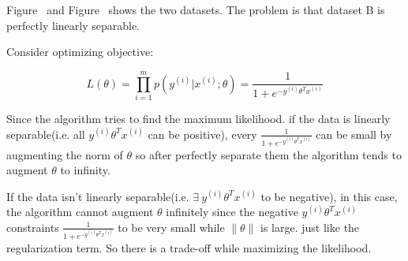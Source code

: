 \begin{answer}
Figure~ and Figure~ shows the two datasets. The problem is that dataset B is perfectly linearly separable. 

Consider optimizing objective:

$$
    L(\theta) = \prod_{i=1}^mp(y^{(i)}|x^{(i)};\theta) = \frac{1}{1 + e^{-y^{(i)}\theta^T x^{(i)}}}
$$

    Since the algorithm tries to find the maximum likelihood. if the data is linearly separable(i.e. all $y^{(i)}\theta^T x^{(i)}$ can be positive), every $ \frac{1}{1 + e^{-y^{(i)}\theta^T x^{(i)}}} $ can be small by augmenting the norm of $ \theta $ so after perfectly separate them the algorithm tends to augment $ \theta $ to infinity.
    
    If the data isn't linearly separable(i.e.  $\exists\  y^{(i)}\theta^T x^{(i)}$ to be negative), in this case, the algorithm cannot augment $ \theta $ infinitely since the negative $y^{(i)}\theta^T x^{(i)}$ constraints $ \frac{1}{1 + e^{-y^{(i)}\theta^T x^{(i)}}} $  to be very small while $ \|\theta\| $ is large. just like the regularization term. So there is a trade-off while maximizing the likelihood. 
\end{answer}

